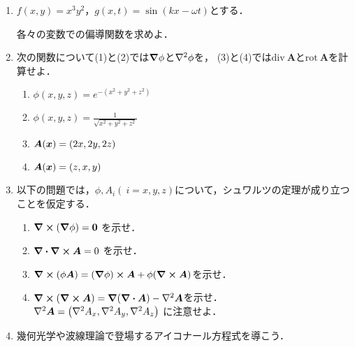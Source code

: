 \documentclass[dvipdfmx,a4j,11pt]{jsarticle}
\begin{document}
\begin{enumerate}[1.]
   \item    $f(x,y)=x^3y^2$，$g(x,t)=\sin (kx-\omega t)$とする．
   
   各々の変数での偏導関数を求めよ．

   \item 次の関数について(1)と(2)では$\grad \phi$と$\laplacian \phi$を，
         (3)と(4)では$\text{div}\ \bm{A}$と$\text{rot}\ \bm{A}$を計算せよ．
         \begin{enumerate}[(1)]
            \item $\phi(x,y,z)=e^{-(x^2+y^2+z^2)}$
            \item $\phi(x,y,z)=\frac{1}{\sqrt{x^2+y^2+z^2}}$
            \item $\bm{A}(\bm{x})=\qty(2x,2y,2z)$
            \item $\bm{A}(\bm{x})=\qty(z,x,y)$
         \end{enumerate}
         
         \vspace{1.0cm}

   \item 以下の問題では，$\phi,A_i(\ i=x,y,z)$について，シュワルツの定理が成り立つことを仮定する．
         \begin{enumerate}[(1)]
            \item $\curl{(\grad \phi)}=\vb{0}$ を示せ．
            \item $\div{\curl \vb*{A}}=0$ を示せ．
            \item $\curl{(\phi \vb*{A})}=
                     (\grad{\phi})\cross \vb*{A}+\phi(\curl{\vb*{A}})$を示せ．
            \item $\curl{(\curl{\vb*{A}})}=
                     \grad{(\div{\vb*{A}})}-\laplacian{\vb*{A}}$を示せ．
                  $\laplacian{\vb*{A}}=\qty(\laplacian{A_x},\laplacian{A_y},\laplacian{A_z})$
                  に注意せよ．
         \end{enumerate}

         \vspace{1.0cm}
   \item 幾何光学や波線理論で登場するアイコナール方程式を導こう．


\end{enumerate}
\end{document}
